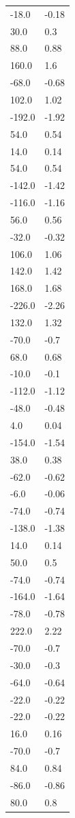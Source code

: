\begin{longtable}{ll}
-18.0 & -0.18 \\
30.0 & 0.3 \\
88.0 & 0.88 \\
160.0 & 1.6 \\
-68.0 & -0.68 \\
102.0 & 1.02 \\
-192.0 & -1.92 \\
54.0 & 0.54 \\
14.0 & 0.14 \\
54.0 & 0.54 \\
-142.0 & -1.42 \\
-116.0 & -1.16 \\
56.0 & 0.56 \\
-32.0 & -0.32 \\
106.0 & 1.06 \\
142.0 & 1.42 \\
168.0 & 1.68 \\
-226.0 & -2.26 \\
132.0 & 1.32 \\
-70.0 & -0.7 \\
68.0 & 0.68 \\
-10.0 & -0.1 \\
-112.0 & -1.12 \\
-48.0 & -0.48 \\
4.0 & 0.04 \\
-154.0 & -1.54 \\
38.0 & 0.38 \\
-62.0 & -0.62 \\
-6.0 & -0.06 \\
-74.0 & -0.74 \\
-138.0 & -1.38 \\
14.0 & 0.14 \\
50.0 & 0.5 \\
-74.0 & -0.74 \\
-164.0 & -1.64 \\
-78.0 & -0.78 \\
222.0 & 2.22 \\
-70.0 & -0.7 \\
-30.0 & -0.3 \\
-64.0 & -0.64 \\
-22.0 & -0.22 \\
-22.0 & -0.22 \\
16.0 & 0.16 \\
-70.0 & -0.7 \\
84.0 & 0.84 \\
-86.0 & -0.86 \\
80.0 & 0.8 \\

\end{longtable}

